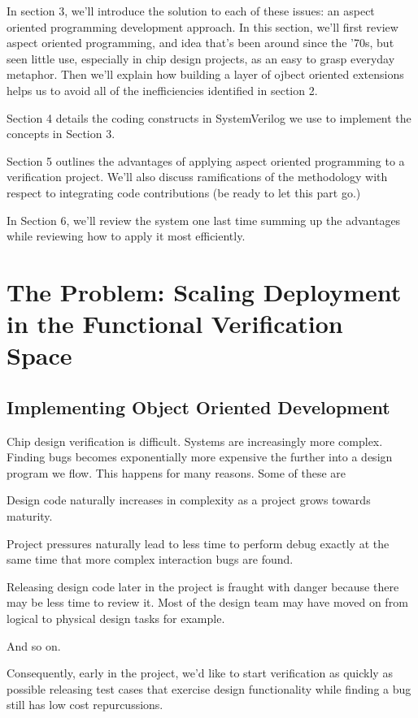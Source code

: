 \documentclass[twocolumn,letterpaper]{IEEEAerospaceCLS}  %
\begin{document}
In section 3, we'll introduce the solution to each of these issues: an aspect oriented programming development approach. In this section, we'll first review aspect oriented programming, and idea that's been around since the '70s, but seen little use, especially in chip design projects, as an easy to grasp everyday metaphor. Then we'll explain how building a layer of ojbect oriented extensions helps us to avoid all of the inefficiencies identified in section 2.

Section 4 details the coding constructs in SystemVerilog we use to implement the concepts in Section 3. 

Section 5 outlines the advantages of applying aspect oriented programming to a verification project. We'll also discuss ramifications of the methodology with respect to integrating code contributions (be ready to let this part go.)

In Section 6, we'll review the system one last time summing up the advantages while reviewing how to apply it most efficiently.




\section{The Problem: Scaling Deployment in the Functional Verification Space}
\subsection{Implementing Object Oriented Development}
Chip design verification is difficult. Systems are increasingly more complex. Finding bugs becomes exponentially more expensive the further into a design program we flow. This happens for many reasons. Some of these are 

Design code naturally increases in complexity as a project grows towards maturity.  

Project pressures naturally lead to less time to perform debug exactly at the same time that more complex interaction bugs are found.

Releasing design code later in the project is fraught with danger because there may be less time to review it. Most of the design team may have moved on from logical to physical design tasks for example.

And so on.

Consequently, early in the project, we'd like to start verification as quickly as possible releasing test cases that exercise design functionality while finding a bug still has low cost repurcussions.
\end{document}
